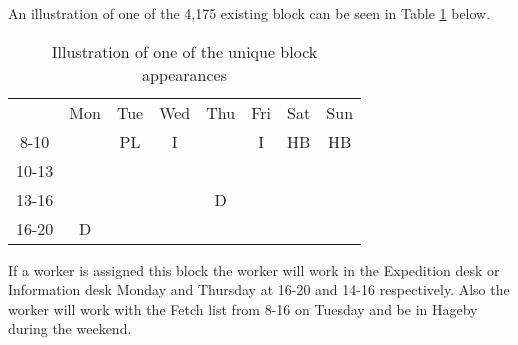 An illustration of one of the 4,175 existing block can be seen in Table \ref{block_example} below.
\begin{table}[!h]
\centering
\caption{Illustration of one of the unique block appearances}
\label{block_example}
\begin{tabular}{cccccccc}
                           & Mon                                            & Tue                                             & Wed                    & Thu                                            & Fri                    & Sat                                             & Sun                                             \\ \cline{2-8} 
\multicolumn{1}{c|}{8-10}  & \multicolumn{1}{c|}{}                          & \multicolumn{1}{c|}{\cellcolor[HTML]{FCFF2F}PL} & \multicolumn{1}{c|}{I} & \multicolumn{1}{c|}{}                          & \multicolumn{1}{c|}{I} & \multicolumn{1}{c|}{\cellcolor[HTML]{FCFF2F}HB} & \multicolumn{1}{c|}{\cellcolor[HTML]{FCFF2F}HB} \\ \cline{2-8} 
\multicolumn{1}{c|}{10-13} & \multicolumn{1}{c|}{}                          & \multicolumn{1}{c|}{\cellcolor[HTML]{FCFF2F}}   & \multicolumn{1}{c|}{}  & \multicolumn{1}{c|}{}                          & \multicolumn{1}{c|}{}  &                                                 &                                                 \\ \cline{2-6}
\multicolumn{1}{c|}{13-16} & \multicolumn{1}{c|}{}                          & \multicolumn{1}{c|}{\cellcolor[HTML]{FCFF2F}}   & \multicolumn{1}{c|}{}  & \multicolumn{1}{c|}{\cellcolor[HTML]{FCFF2F}D} & \multicolumn{1}{c|}{}  &                                                 &                                                 \\ \cline{2-6}
\multicolumn{1}{c|}{16-20} & \multicolumn{1}{c|}{\cellcolor[HTML]{FCFF2F}D} & \multicolumn{1}{c|}{}                           & \multicolumn{1}{c|}{}  & \multicolumn{1}{c|}{}                          & \multicolumn{1}{c|}{}  &                                                 &                                                 \\ \cline{2-6}
\end{tabular}
\end{table}

If a worker is assigned this block the worker will work in the Expedition desk or Information desk Monday and Thursday at 16-20 and 14-16 respectively. Also the worker will work with the Fetch list from 8-16 on Tuesday and be in Hageby during the weekend.


